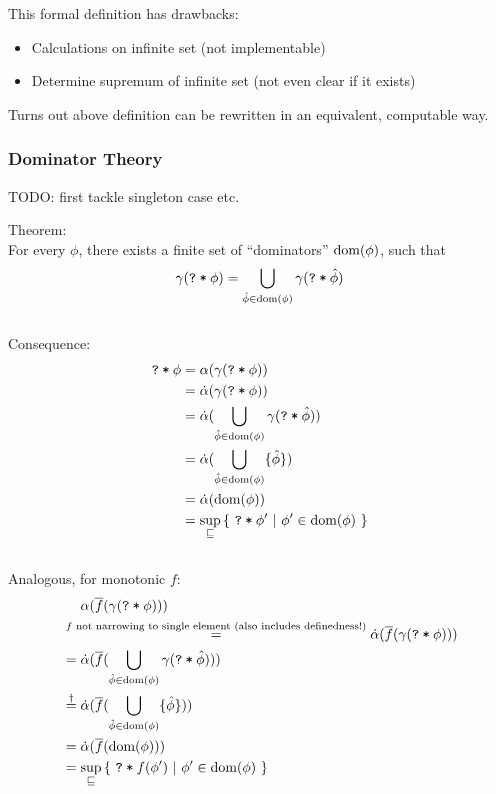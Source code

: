 \documentclass[11pt,a4paper]{article}
\begin{document}
This formal definition has drawbacks:
\begin{itemize}
    \item Calculations on infinite set (not implementable)
    \item Determine supremum of infinite set (not even clear if it exists)
\end{itemize}

Turns out above definition can be rewritten in an equivalent, computable way.

\subsubsection{Dominator Theory}
TODO: first tackle singleton case etc.

Theorem:\\
For every $\phi$, there exists a finite set of “dominators” $\text{dom}(\phi)$, such that 
$$\gamma(\texttt{\texttt{?}\:*\:$\phi$}) = \bigcup_{\hat{\phi} \in \text{dom}(\phi)} \gamma(\texttt{\texttt{?}\:*\:$\hat{\phi}$})$$
~\\

Consequence: 
\begin{align*}
\texttt{\texttt{?}\:*\:$\phi$} 
&= \alpha(\gamma(\texttt{\texttt{?}\:*\:$\phi$})) \\
&= \dot{\alpha}(\gamma(\texttt{\texttt{?}\:*\:$\phi$})) \\
&= \dot{\alpha}(\bigcup_{\hat{\phi} \in \text{dom}(\phi)} \gamma(\texttt{\texttt{?}\:*\:$\hat{\phi}$})) \\
&= \dot{\alpha}(\bigcup_{\hat{\phi} \in \text{dom}(\phi)} \{ \hat{\phi} \}) \\
&= \dot{\alpha}(\text{dom}(\phi)) \\
&= \sup_{\sqsubseteq} {\{~ \texttt{\texttt{?}\:*\:$\phi'$} ~|~ \phi' \in \text{dom}(\phi) ~\}}
\end{align*}
~\\
Analogous, for monotonic $f$: 
\begin{align*}
&~~~~ \alpha(\overline{f}(\gamma(\texttt{\texttt{?}\:*\:$\phi$}))) \\
&\overset{f \text{ not narrowing to single element (also includes definedness!)}}{=} \dot{\alpha}(\overline{f}(\gamma(\texttt{\texttt{?}\:*\:$\phi$}))) \\
&= \dot{\alpha}(\overline{f}(\bigcup_{\hat{\phi} \in \text{dom}(\phi)} \gamma(\texttt{\texttt{?}\:*\:$\hat{\phi}$}))) \\
&\overset{\dagger}{=} \dot{\alpha}(\overline{f}(\bigcup_{\hat{\phi} \in \text{dom}(\phi)} \{ \hat{\phi} \})) \\
&= \dot{\alpha}(\overline{f}(\text{dom}(\phi))) \\
&= \sup_{\sqsubseteq} {\{~ \texttt{\texttt{?}\:*\:$f(\phi')$} ~|~ \phi' \in \text{dom}(\phi) ~\}}
\end{align*}
\end{document}

